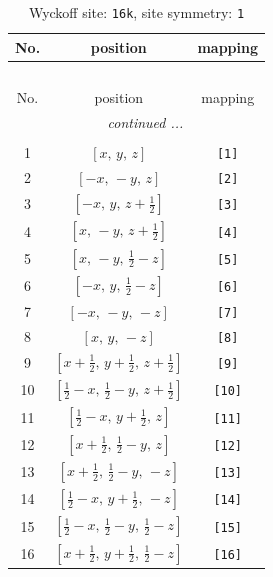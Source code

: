 \documentclass[fleqn,8pt]{jsarticle}
\begin{document}
\begin{longtable}{ccc}
\caption{Wyckoff site: {\tt 16k}, site symmetry: {\tt 1}}
 \\
 \hline \hline
No. & position & mapping \\ \hline \endfirsthead

\multicolumn{2}{l}{\tablename\ \thetable{}} \\
 \hline \hline
No. & position & mapping \\ \hline \endhead

 \hline \hline
\multicolumn{2}{r}{\footnotesize\it continued ...} \\ \endfoot

 \hline \hline
\multicolumn{2}{r}{} \\ \endlastfoot

1 & $\left[ x,\, y,\, z \right]$ & {\tt [1]} \\ \hline
2 & $\left[ - x,\, - y,\, z \right]$ & {\tt [2]} \\ \hline
3 & $\left[ - x,\, y,\, z + \frac{1}{2} \right]$ & {\tt [3]} \\ \hline
4 & $\left[ x,\, - y,\, z + \frac{1}{2} \right]$ & {\tt [4]} \\ \hline
5 & $\left[ x,\, - y,\, \frac{1}{2} - z \right]$ & {\tt [5]} \\ \hline
6 & $\left[ - x,\, y,\, \frac{1}{2} - z \right]$ & {\tt [6]} \\ \hline
7 & $\left[ - x,\, - y,\, - z \right]$ & {\tt [7]} \\ \hline
8 & $\left[ x,\, y,\, - z \right]$ & {\tt [8]} \\ \hline
9 & $\left[ x + \frac{1}{2},\, y + \frac{1}{2},\, z + \frac{1}{2} \right]$ & {\tt [9]} \\ \hline
10 & $\left[ \frac{1}{2} - x,\, \frac{1}{2} - y,\, z + \frac{1}{2} \right]$ & {\tt [10]} \\ \hline
11 & $\left[ \frac{1}{2} - x,\, y + \frac{1}{2},\, z \right]$ & {\tt [11]} \\ \hline
12 & $\left[ x + \frac{1}{2},\, \frac{1}{2} - y,\, z \right]$ & {\tt [12]} \\ \hline
13 & $\left[ x + \frac{1}{2},\, \frac{1}{2} - y,\, - z \right]$ & {\tt [13]} \\ \hline
14 & $\left[ \frac{1}{2} - x,\, y + \frac{1}{2},\, - z \right]$ & {\tt [14]} \\ \hline
15 & $\left[ \frac{1}{2} - x,\, \frac{1}{2} - y,\, \frac{1}{2} - z \right]$ & {\tt [15]} \\ \hline
16 & $\left[ x + \frac{1}{2},\, y + \frac{1}{2},\, \frac{1}{2} - z \right]$ & {\tt [16]} \\
\end{longtable}
\end{document}
